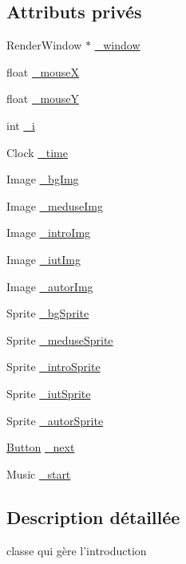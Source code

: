 \subsection*{Attributs privés}
\begin{DoxyCompactItemize}
\item 
RenderWindow $\ast$ \hyperlink{classIntro_ad6c450761f6e94f2c792fa7f3c94f727}{\_\-window}
\item 
float \hyperlink{classIntro_aa1179bb818854490713b745cf3f7b76a}{\_\-mouseX}
\item 
float \hyperlink{classIntro_aa7176ab41961225c977991ad55f115b5}{\_\-mouseY}
\item 
int \hyperlink{classIntro_a0e13edf1262e2d47720214b44a80894f}{\_\-i}
\item 
Clock \hyperlink{classIntro_af07ea5ea2a5ca224b580a089050cf5d8}{\_\-time}
\item 
Image \hyperlink{classIntro_a9bc7b99bb30e25f23ed0edfbec0aab2c}{\_\-bgImg}
\item 
Image \hyperlink{classIntro_a4a74bd87a3eb1def2f9a5e6c4b73d925}{\_\-meduseImg}
\item 
Image \hyperlink{classIntro_a5d1cb07f49e26803031da63886ad8674}{\_\-introImg}
\item 
Image \hyperlink{classIntro_a79582993aa2da7b526d298d0dba5c8db}{\_\-iutImg}
\item 
Image \hyperlink{classIntro_a6795711abfaaeb4dd292553c7b92722c}{\_\-autorImg}
\item 
Sprite \hyperlink{classIntro_a82f0f85c29f0b8e18b5c9aefd49ac495}{\_\-bgSprite}
\item 
Sprite \hyperlink{classIntro_ae44f88376a76a1c8e97625f2a0876614}{\_\-meduseSprite}
\item 
Sprite \hyperlink{classIntro_a7d779c0bad9dc6d2cdbcfffa4fbe3729}{\_\-introSprite}
\item 
Sprite \hyperlink{classIntro_aed059e770fb69c1bbc8819eba50633b2}{\_\-iutSprite}
\item 
Sprite \hyperlink{classIntro_a342c936948e27a330214faf21d2de6a3}{\_\-autorSprite}
\item 
\hyperlink{classButton}{Button} \hyperlink{classIntro_a464a521d4ae5e2a1ca309184504d998b}{\_\-next}
\item 
Music \hyperlink{classIntro_afb88102685cacb8b825729533b3ad092}{\_\-start}
\end{DoxyCompactItemize}


\subsection{Description détaillée}
classe qui gère l'introduction 

